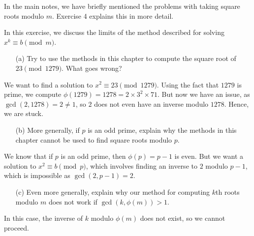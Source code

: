 \documentclass{article}
\begin{document}
In the main notes, we have briefly mentioned the problems with taking square roots modulo $m$. Exercise 4 explains this in more detail.
\begin{exercise}[Chapter 17, \#5]
In this exercise, we discuss the limits of the method described for solving $x^k\equiv b\pmod m$.
\begin{itemize}
    \item[(a)] Try to use the methods in this chapter to compute the square root of $23\pmod{1279}$. What goes wrong?
\end{itemize}
\begin{solution}
We want to find a solution to $x^2\equiv 23\pmod{1279}$. Using the fact that $1279$ is prime, we compute $\phi(1279) = 1278 = 2\times 3^2\times 71$. But now we have an issue, as $\gcd(2, 1278) = 2 \neq 1$, so $2$ does not even have an inverse modulo $1278$. Hence, we are stuck.
\end{solution}
\begin{itemize}
    \item[(b)] More generally, if $p$ is an odd prime, explain why the methods in this chapter cannot be used to find square roots modulo $p$.
\end{itemize}
\begin{solution}
We know that if $p$ is an odd prime, then $\phi(p) = p-1$ is even. But we want a solution to $x^2\equiv b\pmod p$, which involves finding an inverse to $2$ modulo $p-1$, which is impossible as $\gcd(2, p-1) = 2$.
\end{solution}

\begin{itemize}
    \item[(c)] Even more generally, explain why our method for computing $k$th roots modulo $m$ does not work if $\gcd(k, \phi(m)) > 1$.
\end{itemize}
\begin{solution}
In this case, the inverse of $k$ modulo $\phi(m)$ does not exist, so we cannot proceed.
\end{solution}
\end{exercise}
\end{document}
